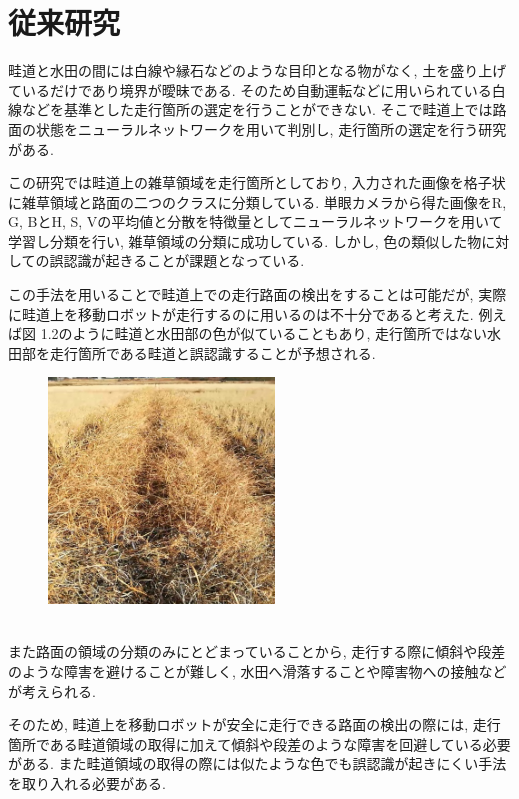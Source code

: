 
\section{従来研究}

畦道と水田の間には白線や縁石などのような目印となる物がなく, 土を盛り上げているだけであり境界が曖昧である. 
そのため自動運転などに用いられている白線などを基準とした走行箇所の選定を行うことができない. 
そこで畦道上では路面の状態をニューラルネットワークを用いて判別し, 
走行箇所の選定を行う研究\cite{長橋孝哉2019ニューラルネットワークを用いた畦道の雑草検出に関する研究}がある.  

この研究では畦道上の雑草領域を走行箇所としており, 入力された画像を格子状に雑草領域と路面の二つのクラスに分類している. 
単眼カメラから得た画像をR, G, BとH, S, Vの平均値と分散を特徴量としてニューラルネットワークを用いて学習し分類を行い,   
雑草領域の分類に成功している. しかし, 色の類似した物に対しての誤認識が起きることが課題となっている.

この手法を用いることで畦道上での走行路面の検出をすることは可能だが, 実際に畦道上を移動ロボットが走行するのに用いるのは不十分であると考えた. 
例えば図 1.2のように畦道と水田部の色が似ていることもあり, 走行箇所ではない水田部を走行箇所である畦道と誤認識することが予想される.  
\begin{figure}[htbp]
\begin{center}
\includegraphics[width=60mm]{figs/fig2.jpg}
\caption{}
\end{center}
\end{figure}
\\また路面の領域の分類のみにとどまっていることから, 走行する際に傾斜や段差のような障害を避けることが難しく, 水田へ滑落することや障害物への接触などが考えられる. 

そのため, 畦道上を移動ロボットが安全に走行できる路面の検出の際には, 走行箇所である畦道領域の取得に加えて傾斜や段差のような障害を回避している必要がある. 
また畦道領域の取得の際には似たような色でも誤認識が起きにくい手法を取り入れる必要がある. 
